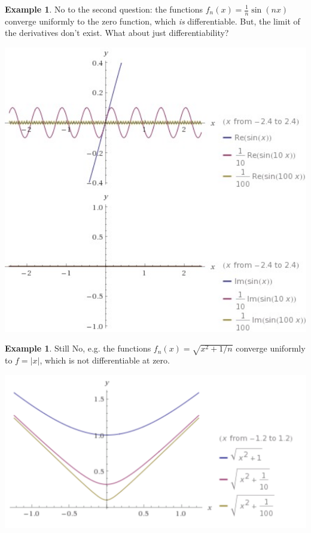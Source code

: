 \documentclass[12pt]{article}
\theoremstyle{plain}
\theoremstyle{definition}
\newtheorem{example}[theorem]{Example}
\theoremstyle{remark}
\begin{document}
\begin{example}
No to the second question: the functions $f_n(x) = \frac{1}{n} \sin(nx)$ converge uniformly to the zero function, which \textit{is} differentiable. But, the limit of the derivatives don't exist. What about just differentiability?
\end{example}

\centerline{\includegraphics[width=1.0\textwidth]{uniformconvergence1}}

\begin{example}
Still No, e.g. the functions $f_n(x) = \sqrt{x^2 + 1/n}$ converge uniformly to $f = |x|$, which is not differentiable at zero.
\end{example}

\centerline{\includegraphics[width=1.0\textwidth]{uniformconvergence2}}
\end{document}
